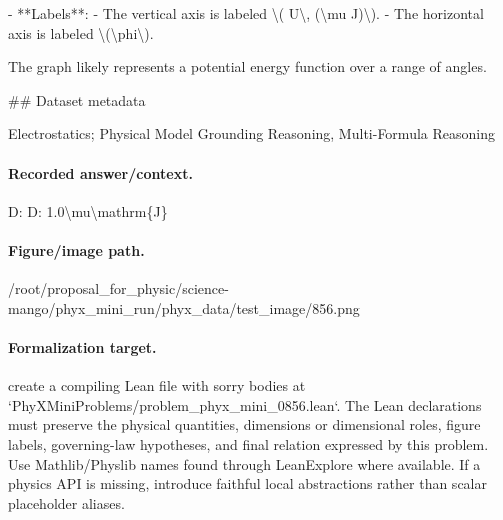 - **Labels**:
  - The vertical axis is labeled \textbackslash{}( U\textbackslash{}, (\textbackslash{}mu J)\textbackslash{}).
  - The horizontal axis is labeled \textbackslash{}(\textbackslash{}phi\textbackslash{}).

The graph likely represents a potential energy function over a range of angles.

\#\# Dataset metadata

Electrostatics; Physical Model Grounding Reasoning, Multi-Formula Reasoning

\paragraph{Recorded answer/context.}
D: D: 1.0\textbackslash{}mu\textbackslash{}mathrm\{J\}

\paragraph{Figure/image path.}
/root/proposal\_for\_physic/science-mango/phyx\_mini\_run/phyx\_data/test\_image/856.png

\paragraph{Formalization target.}
create a compiling Lean file with sorry bodies at `PhyXMiniProblems/problem\_phyx\_mini\_0856.lean`. The Lean declarations must preserve the physical quantities, dimensions or dimensional roles, figure labels, governing-law hypotheses, and final relation expressed by this problem.
Use Mathlib/Physlib names found through LeanExplore where available. If a physics API is missing, introduce faithful local abstractions rather than scalar placeholder aliases.

